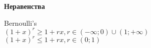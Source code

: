 \textbf{Неравенства}

Bernoulli's  \\
$(1+x)^r \ge 1+rx, r\in(-\infty ;0)\cup(1;+\infty )$  \\
$(1+x)^r \le 1+rx, r \in (0;1)$